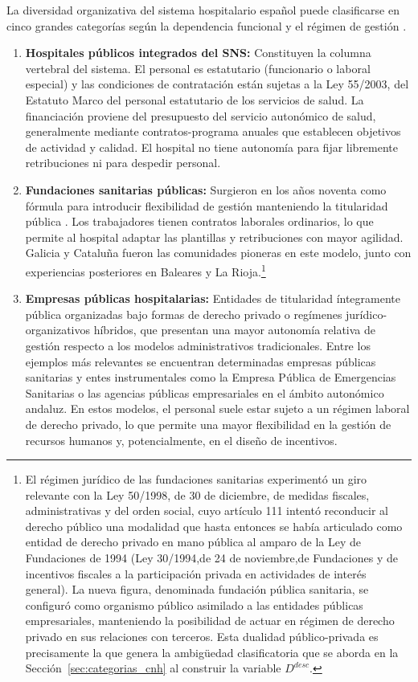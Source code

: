 La diversidad organizativa del sistema hospitalario español puede 
clasificarse en cinco grandes categorías según la dependencia 
funcional y el régimen de gestión \citep{menendez2008}.

\begin{enumerate}[label=(\roman*)]
  \item \textbf{Hospitales públicos integrados del SNS:} Constituyen 
  la columna vertebral del sistema. El personal es estatutario 
  (funcionario o laboral especial) y las condiciones de contratación 
  están sujetas a la Ley 55/2003, del Estatuto Marco del personal 
  estatutario de los servicios de salud. La financiación proviene 
  del presupuesto del servicio autonómico de salud, generalmente 
  mediante contratos-programa anuales que establecen objetivos de 
  actividad y calidad. El hospital no tiene autonomía para fijar 
  libremente retribuciones ni para despedir personal.

  \item \textbf{Fundaciones sanitarias públicas:} Surgieron en los 
  años noventa como fórmula para introducir flexibilidad de gestión 
  manteniendo la titularidad pública \citep{menendez2008}. Los 
  trabajadores tienen contratos laborales ordinarios, lo que permite 
  al hospital adaptar las plantillas y retribuciones con mayor 
  agilidad. Galicia y Cataluña fueron las comunidades pioneras en 
  este modelo, junto con experiencias posteriores en Baleares y 
  La Rioja.\footnote{El régimen jurídico de las fundaciones 
  sanitarias experimentó un giro relevante con la Ley 50/1998, de 
  30 de diciembre, de medidas fiscales, administrativas y del orden 
  social, cuyo artículo 111 intentó reconducir al derecho público 
  una modalidad que hasta entonces se había articulado como entidad 
  de derecho privado en mano pública al amparo de la Ley de 
  Fundaciones de 1994 (Ley 30/1994,de 24 de noviembre,de Fundaciones y de incentivos
fiscales a la participación privada en
actividades de interés general). La nueva figura, denominada fundación pública 
  sanitaria, se configuró como organismo público asimilado a las 
  entidades públicas empresariales, manteniendo la posibilidad de 
  actuar en régimen de derecho privado en sus relaciones con 
  terceros. Esta dualidad público-privada es precisamente la que 
  genera la ambigüedad clasificatoria que se aborda en la 
  Sección~\ref{sec:categorias_cnh} al construir la variable 
  $D^{desc}$.}

  \item \textbf{Empresas públicas hospitalarias:} Entidades de titularidad íntegramente pública organizadas bajo formas de derecho privado o regímenes jurídico-organizativos híbridos, que presentan una mayor autonomía relativa de gestión respecto a los modelos administrativos tradicionales. Entre los ejemplos más relevantes se encuentran determinadas empresas públicas sanitarias y entes instrumentales como la Empresa Pública de Emergencias Sanitarias o las agencias públicas empresariales en el ámbito autonómico andaluz. En estos modelos, el personal suele estar sujeto a un régimen laboral de derecho privado, lo que permite una mayor flexibilidad en la gestión de recursos humanos y, potencialmente, en el diseño de incentivos.


\end{enumerate}
